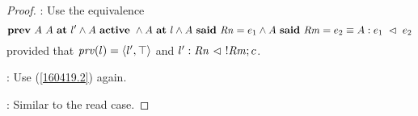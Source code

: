 \begin{proof}
\noindent{}: Use the equivalence
%
\begin{equation}
\label{160419.2}
\Prev\ A\ A\ \At\ \Label' \wedge A\ \Active\ \wedge A\ \At\ \Label \wedge A\ \Says\ \Rn = e_1 \wedge A\ \Says\ \Rm = e_2 \equiv  A:e_1\ \ReadFrom\ e_2
\end{equation}
provided that $\mathit{prv}(l) = \langle l',\top\rangle$ and $\Label':\Rn\ \ReadFrom\ !\Rm;c$.

\noindent{}: Use (\ref{160419.2}) again.

\noindent{}: Similar to the read case. 

\end{proof}
